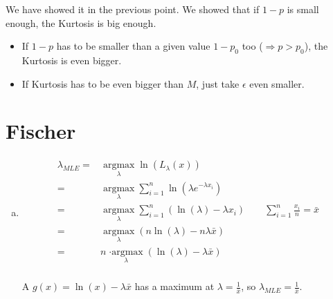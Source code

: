 \documentclass{article}
\begin{document}
\begin{enumerate}[(a)]
          We have showed it in the previous point. We showed that if $1-p$ is small enough, the Kurtosis is big enough.
          \begin{itemize}
              \item If $1-p$ has to be smaller than a given value $1-p_0$ too ($\Rightarrow p>p_0$), the Kurtosis is even bigger.
              \item If Kurtosis has to be even bigger than $M$, just take $\epsilon$ even smaller.
          \end{itemize}
\end{enumerate}

\section{Fischer}
\begin{enumerate}[(a)]
    \item
          \[\begin{aligned}
                  {\lambda _{MLE}} = & \mathop {\arg \max }\limits_\lambda  \ln \left( {{L_\lambda }\left( x \right)} \right)                                                                                              \\
                  =                  & \mathop {\arg \max }\limits_\lambda  \sum\limits_{i = 1}^n {\ln \left( {\lambda {e^{ - \lambda {x_i}}}} \right)}                                                                    \\
                  =                  & \mathop {\arg \max }\limits_\lambda  \sum\limits_{i = 1}^n {\left( {\ln \left( \lambda  \right) - \lambda {x_i}} \right)\qquad \sum\limits_{i = 1}^n {\frac{{{x_i}}}{n}}  = \bar x} \\
                  =                  & \mathop {\arg \max }\limits_\lambda  \left( {n\ln \left( \lambda  \right) - n\lambda \bar x} \right)                                                                                \\
                  =                  & n\mathop { \cdot \arg \max }\limits_\lambda  \left( {\ln \left( \lambda  \right) - \lambda \bar x} \right)                                                                          \\
              \end{aligned} \]

          A $g(x) = \ln(x) - \lambda\bar{x}$ has a maximum at \(\lambda = \frac{1}{\bar{x}}\), so $\lambda_{MLE} = \frac{1}{\bar{x}}$.


\end{enumerate}
\end{document}
